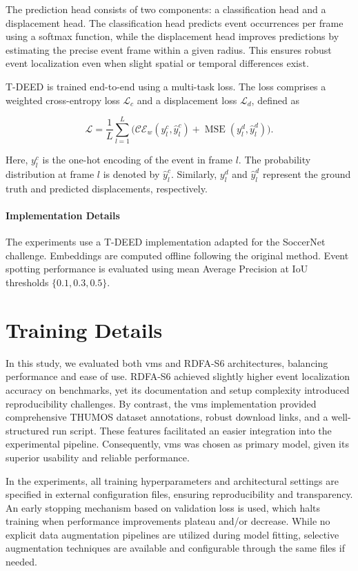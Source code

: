 The prediction head consists of two components: a classification head and a displacement head. The classification head predicts event occurrences per frame using a softmax function, while the displacement head improves predictions by estimating the precise event frame within a given radius. This ensures robust event localization even when slight spatial or temporal differences exist.


T-DEED is trained end-to-end using a multi-task loss. The loss comprises a weighted cross-entropy loss \(\mathcal{L}_c\) and a displacement loss \(\mathcal{L}_d\), defined as

\[
\mathcal{L} = \frac{1}{L}\sum_{l=1}^{L}\Big(\mathcal{CE}_{w}(y_l^{c},\hat{y}_l^c) + \operatorname{MSE}(y_l^{d},\hat{y}_l^d)\Big).
\]

Here, \(y_l^{c}\) is the one-hot encoding of the event in frame \(l\). The probability distribution at frame \(l\) is denoted by \(\hat{y}_l^c\). Similarly, \(y_l^{d}\) and \(\hat{y}_l^d\) represent the ground truth and predicted displacements, respectively.

\paragraph{Implementation Details} The experiments use a T-DEED implementation adapted for the SoccerNet challenge. Embeddings are computed offline following the original method. Event spotting performance is evaluated using mean Average Precision at IoU thresholds \(\{0.1,0.3,0.5\}\).


\section{Training Details}

In this study, we evaluated both \acrshort{vms} and RDFA-S6 architectures, balancing performance and ease of use. RDFA-S6 achieved slightly higher event localization accuracy on benchmarks, yet its documentation and setup complexity introduced reproducibility challenges. By contrast, the \acrshort{vms} implementation provided comprehensive THUMOS dataset annotations, robust download links, and a well-structured run script. These features facilitated an easier integration into the experimental pipeline. Consequently, \acrshort{vms} was chosen as primary model, given its superior usability and reliable performance.

In the experiments, all training hyperparameters and architectural settings are specified in external configuration files, ensuring reproducibility and transparency. An early stopping mechanism based on validation loss is used, which halts training when performance improvements plateau and/or decrease. While no explicit data augmentation pipelines are utilized during model fitting, selective augmentation techniques are available and configurable through the same files if needed.

